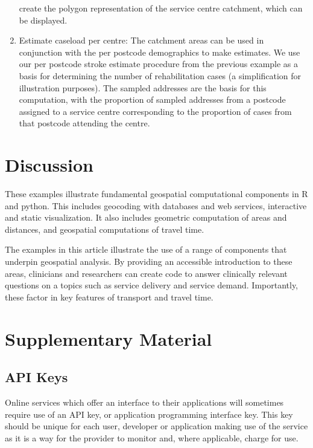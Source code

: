 \documentclass[]{article}
\begin{document}
\begin{enumerate}
  create the polygon representation of the service centre catchment,
  which can be displayed.
\item
  Estimate caseload per centre: The catchment areas can be used in
  conjunction with the per postcode demographics to make estimates. We
  use our per postcode stroke estimate procedure from the previous
  example as a basis for determining the number of rehabilitation cases
  (a simplification for illustration purposes). The sampled addresses
  are the basis for this computation, with the proportion of sampled
  addresses from a postcode assigned to a service centre corresponding
  to the proportion of cases from that postcode attending the centre.
\end{enumerate}

\hypertarget{discussion}{%
\section{Discussion}\label{discussion}}

These examples illustrate fundamental geospatial computational
components in R and python. This includes geocoding with databases and
web services, interactive and static visualization. It also includes
geometric computation of areas and distances, and geospatial
computations of travel time.

The examples in this article illustrate the use of a range of components
that underpin geospatial analysis. By providing an accessible
introduction to these areas, clinicians and researchers can create code
to answer clinically relevant questions on a topics such as service
delivery and service demand. Importantly, these factor in key features
of transport and travel time.

\hypertarget{supplementary-material}{%
\section{Supplementary Material}\label{supplementary-material}}

\hypertarget{api-keys}{%
\subsection{API Keys}\label{api-keys}}

Online services which offer an interface to their applications will
sometimes require use of an API key, or application programming
interface key. This key should be unique for each user, developer or
application making use of the service as it is a way for the provider to
monitor and, where applicable, charge for use.
\end{document}
